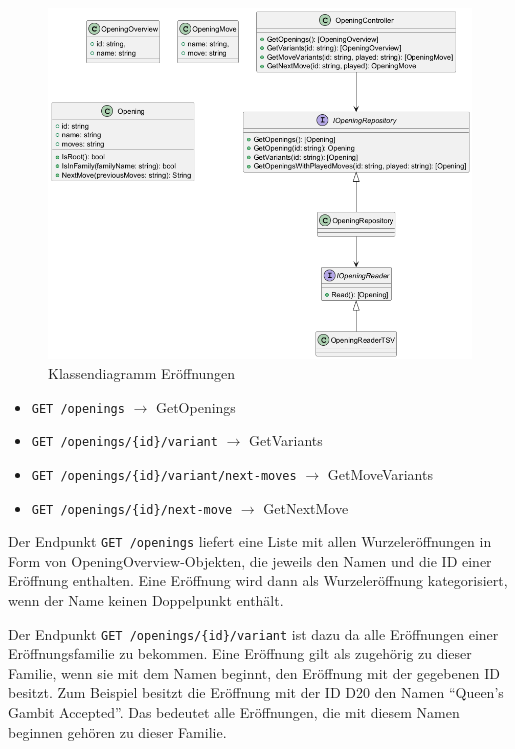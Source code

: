 \begin{figure}[htb]
  \includegraphics[width=\linewidth]{images/diagrams/opening.png}
  \caption{Klassendiagramm Eröffnungen}
  \label{fig:cd_opening}
\end{figure}

\begin{itemize}
  \item \lstinline|GET /openings| $\rightarrow$ GetOpenings
  \item \lstinline|GET /openings/{id}/variant| $\rightarrow$ GetVariants
  \item \lstinline|GET /openings/{id}/variant/next-moves| $\rightarrow$ GetMoveVariants
  \item \lstinline|GET /openings/{id}/next-move| $\rightarrow$ GetNextMove
\end{itemize}

Der Endpunkt \lstinline{GET /openings} liefert eine Liste mit allen Wurzeleröffnungen in Form von OpeningOverview-Objekten, die jeweils den Namen und die ID einer Eröffnung enthalten.
Eine Eröffnung wird dann als Wurzeleröffnung kategorisiert, wenn der Name keinen Doppelpunkt enthält. %

Der Endpunkt \lstinline|GET /openings/{id}/variant| ist dazu da alle Eröffnungen einer Eröffnungsfamilie zu bekommen. Eine Eröffnung gilt als zugehörig zu dieser Familie, wenn sie mit dem Namen beginnt, den Eröffnung mit der gegebenen ID besitzt. Zum Beispiel besitzt die Eröffnung mit der ID D20 den Namen \enquote{Queen's Gambit Accepted}. Das bedeutet alle Eröffnungen, die mit diesem Namen beginnen gehören zu dieser Familie.

